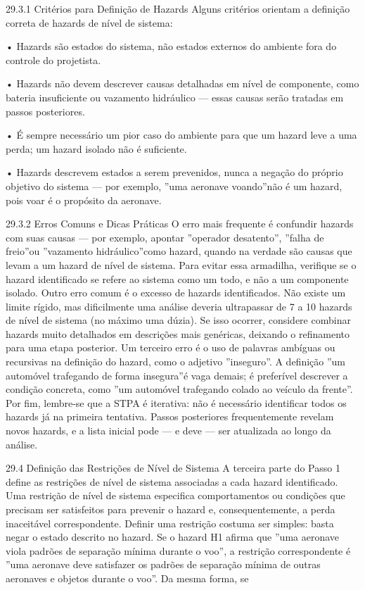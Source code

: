 29.3.1 Critérios para Definição de Hazards Alguns critérios orientam a definição correta de hazards de nível de sistema:

• Hazards são estados do sistema, não estados externos do ambiente fora do controle do projetista.

• Hazards não devem descrever causas detalhadas em nível de componente, como bateria insuficiente ou vazamento hidráulico — essas causas serão tratadas em passos posteriores.

• É sempre necessário um pior caso do ambiente para que um hazard leve a uma perda; um hazard isolado não é suficiente.

• Hazards descrevem estados a serem prevenidos, nunca a negação do próprio objetivo do sistema — por exemplo, ”uma aeronave voando”não é um hazard, pois voar é o propósito da aeronave.

29.3.2 Erros Comuns e Dicas Práticas O erro mais frequente é confundir hazards com suas causas — por exemplo, apontar ”operador desatento”, ”falha de freio”ou ”vazamento hidráulico”como hazard, quando na verdade são causas que levam a um hazard de nível de sistema. Para evitar essa armadilha, verifique se o hazard identificado se refere ao sistema como um todo, e não a um componente isolado. Outro erro comum é o excesso de hazards identificados. Não existe um limite rígido, mas dificilmente uma análise deveria ultrapassar de 7 a 10 hazards de nível de sistema (no máximo uma dúzia). Se isso ocorrer, considere combinar hazards muito detalhados em descrições mais genéricas, deixando o refinamento para uma etapa posterior. Um terceiro erro é o uso de palavras ambíguas ou recursivas na definição do hazard, como o adjetivo ”inseguro”. A definição ”um automóvel trafegando de forma insegura”é vaga demais; é preferível descrever a condição concreta, como ”um automóvel trafegando colado ao veículo da frente”. Por fim, lembre-se que a STPA é iterativa: não é necessário identificar todos os hazards já na primeira tentativa. Passos posteriores frequentemente revelam novos hazards, e a lista inicial pode — e deve — ser atualizada ao longo da análise.

29.4 Definição das Restrições de Nível de Sistema A terceira parte do Passo 1 define as restrições de nível de sistema associadas a cada hazard identificado. Uma restrição de nível de sistema especifica comportamentos ou condições que precisam ser satisfeitos para prevenir o hazard e, consequentemente, a perda inaceitável correspondente. Definir uma restrição costuma ser simples: basta negar o estado descrito no hazard. Se o hazard H1 afirma que ”uma aeronave viola padrões de separação mínima durante o voo”, a restrição correspondente é ”uma aeronave deve satisfazer os padrões de separação mínima de outras aeronaves e objetos durante o voo”. Da mesma forma, se

